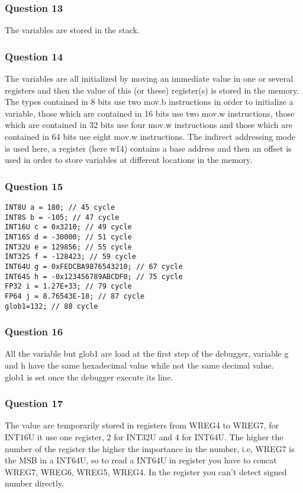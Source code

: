 \documentclass[a4paper,10pt]{article}
\begin{document}
\subsubsection*{Question 13}
The variables are stored in the stack.

\subsubsection*{Question 14}
The variables are all initialized by moving an immediate value in one or several registers and then the value of  this (or these) register(s) is stored in the memory. The types contained in 8 bits use two mov.b instructions in order to initialize a variable, those which are contained in 16 bits use two mov.w instructions, those which are contained in 32 bits use four mov.w instructions and those which are contained in 64 bits use eight mov.w instructions. The indirect addressing mode is used here, a register (here w14) contains a base address and then an offset is used in order to store variables at different locations in the memory.

\subsubsection*{Question 15}
\begin{verbatim}
INT8U a = 180; // 45 cycle
INT8S b = -105; // 47 cycle
INT16U c = 0x3210; // 49 cycle
INT16S d = -30000; // 51 cycle
INT32U e = 129856; // 55 cycle
INT32S f = -128423; // 59 cycle
INT64U g = 0xFEDCBA9876543210; // 67 cycle
INT64S h = -0x123456789ABCDF0; // 75 cycle
FP32 i = 1.27E+33; // 79 cycle
FP64 j = 8.76543E-18; // 87 cycle
glob1=132; // 88 cycle
\end{verbatim}

\subsubsection*{Question 16}
All the variable but glob1 are load at the first step of the debugger, variable g and h have the same hexadecimal value while not the same decimal value.\\
glob1 is set once the debugger execute its line.

\subsubsection*{Question 17}
The value are temporarily stored in registers from WREG4 to WREG7, for INT16U it use one register, 2 for INT32U and 4 for INT64U. The higher the number of the register the higher the importance in the number, i.e, WREG7 is the MSB in a INT64U, so to read a INT64U in register you have to concat WREG7, WREG6, WREG5, WREG4.
In the register you can't detect signed number directly.
\end{document}
